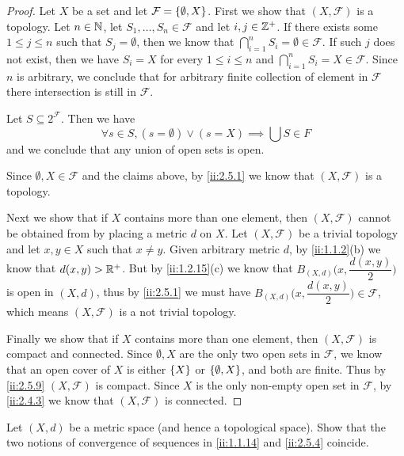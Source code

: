 \begin{proof}
  Let \(X\) be a set and let \(\mathcal{F} = \left\lbrace\emptyset, X\right\rbrace\).
  First we show that \((X, \mathcal{F})\) is a topology.
  Let \(n \in \mathbb{N}\), let \(S_1, \dots, S_n \in \mathcal{F}\) and let \(i, j \in \mathbb{Z}^+\).
  If there exists some \(1 \leq j \leq n\) such that \(S_j = \emptyset\), then we know that \(\bigcap_{i = 1}^n S_i = \emptyset \in \mathcal{F}\).
  If such \(j\) does not exist, then we have \(S_i = X\) for every \(1 \leq i \leq n\) and \(\bigcap_{i = 1}^n S_i = X \in \mathcal{F}\).
  Since \(n\) is arbitrary, we conclude that for arbitrary finite collection of element in \(\mathcal{F}\) there intersection is still in \(\mathcal{F}\).

  Let \(S \subseteq 2^{\mathcal{F}}\).
  Then we have
  \[
    \forall s \in S, (s = \emptyset) \lor (s = X) \implies \bigcup S \in F
  \]
  and we conclude that any union of open sets is open.

  Since \(\emptyset, X \in \mathcal{F}\) and the claims above, by \cref{ii:2.5.1} we know that \((X, \mathcal{F})\) is a topology.

  Next we show that if \(X\) contains more than one element, then \((X, \mathcal{F})\) cannot be obtained from by placing a metric \(d\) on \(X\).
  Let \((X, \mathcal{F})\) be a trivial topology and let \(x, y \in X\) such that \(x \neq y\).
  Given arbitrary metric \(d\), by \cref{ii:1.1.2}(b) we know that \(d(x, y) > \mathbb{R}^+\).
  But by \cref{ii:1.2.15}(c) we know that \(B_{(X, d)}\big(x, \dfrac{d(x, y)}{2}\big)\) is open in \((X, d)\), thus by \cref{ii:2.5.1} we must have \(B_{(X, d)}\big(x, \dfrac{d(x, y)}{2}\big) \in \mathcal{F}\), which means \((X, \mathcal{F})\) is a not trivial topology.

  Finally we show that if \(X\) contains more than one element, then \((X, \mathcal{F})\) is compact and connected.
  Since \(\emptyset, X\) are the only two open sets in \(\mathcal{F}\), we know that an open cover of \(X\) is either \(\left\lbrace X\right\rbrace\) or \(\left\lbrace\emptyset, X\right\rbrace\), and both are finite.
  Thus by \cref{ii:2.5.9} \((X, \mathcal{F})\) is compact.
  Since \(X\) is the only non-empty open set in \(\mathcal{F}\), by \cref{ii:2.4.3} we know that \((X, \mathcal{F})\) is connected.
\end{proof}

\begin{ex}\label{ii:ex:2.5.2}
  Let \((X, d)\) be a metric space
  (and hence a topological space).
  Show that the two notions of convergence of sequences in \cref{ii:1.1.14} and \cref{ii:2.5.4} coincide.
\end{ex}

